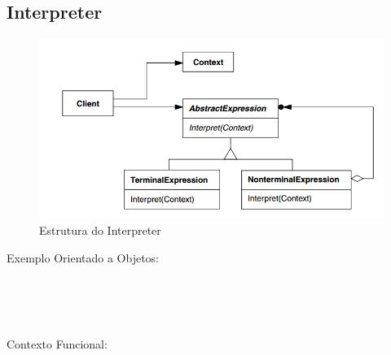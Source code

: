 \subsection{Interpreter}

\begin{figure}[htb]
	\caption{\label{fig_grafico}Estrutura do Interpreter}
	\begin{center}
	    \includegraphics[scale=0.5]{5_padroes-contexto-funcional/5.3_comportamentais/5.3.03_interpreter/diagram.png}
	\end{center}
\end{figure}

Exemplo Orientado a Objetos:

\begin{lstlisting}[caption={Interpreter Orientação a Objetos},label=oointerpreter]


    
\end{lstlisting}

Contexto Funcional:


\begin{lstlisting}[caption={Interpreter Funcional},label=fpinterpreter]
    

    
\end{lstlisting}